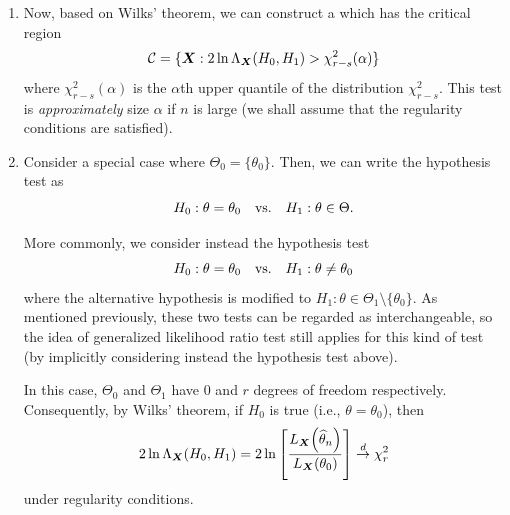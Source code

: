 \begin{enumerate}
\begin{theorem}
\label{thm:wilks}
Under \emph{regularity conditions}\footnote{We shall omit the technical details
here.} and if the null hypothesis \(H_0\) is true (i.e, \(\theta\in\Theta_0\)),
\[
\{2\ln\Lambda_{\vect{X}}(H_0, H_1)\}\convd\chi^2_{r-s}.
\]
\begin{note}
Recall that \(r\) and \(s\) are degrees of freedom for \(\Theta_1\) and
\(\Theta_0\) respectively.
\end{note}
\end{theorem}

\item Now, based on Wilks' theorem, we can construct a  which has the critical region
\[
\mathcal{C}=\{\vb*{X}:2\ln\Lambda_{\vb*{X}}(H_0, H_1)>\chi^2_{r-s}(\alpha)\}
\]
where \(\chi^2_{r-s}(\alpha)\) is the \(\alpha\)th upper quantile of the
distribution \(\chi^2_{r-s}\). This test is \emph{approximately} size
\(\alpha\) if \(n\) is large (we shall assume that the regularity conditions are
satisfied).


\item Consider a special case where \(\Theta_0=\{\theta_0\}\). Then, we can
write the hypothesis test as
\[
H_0:\theta=\theta_0\qqtext{vs.}H_1:\theta\in\Theta.
\]
\begin{note}
More commonly, we consider instead the hypothesis test
\[
H_0:\theta=\theta_0\qqtext{vs.}H_1:\theta\ne\theta_0
\]
where the alternative hypothesis is modified to \(H_1:
\theta\in\Theta_1\setminus\{\theta_0\}\). As mentioned previously, these two
tests can be regarded as interchangeable, so the idea of generalized likelihood
ratio test still applies for this kind of test (by implicitly considering
instead the hypothesis test above).
\end{note}

In this case, \(\Theta_0\) and \(\Theta_1\) have 0 and \(r\) degrees of freedom
respectively. Consequently, by Wilks' theorem, if \(H_0\) is true (i.e.,
\(\theta=\theta_0\)), then
\[
2\ln\Lambda_{\vb*{X}}(H_0,H_1)=
2\ln\qty[\frac{L_{\vb*{X}}\qty(\widehat{\theta}_n)}{L_{\vb*{X}}\qty(\theta_0)}]
\overset{d}{\to}\chi^2_r
\]
under regularity conditions.
\end{enumerate}
